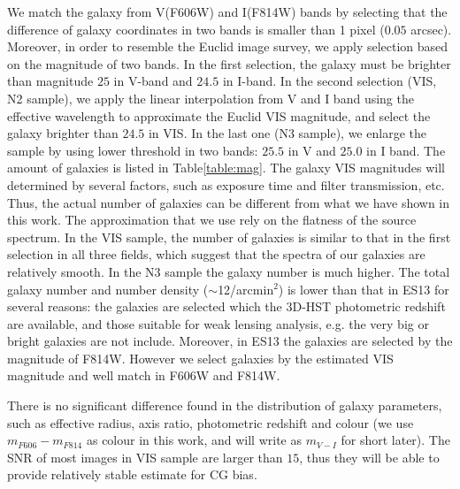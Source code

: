 \documentclass[useAMS,usenatbib]{mn2e}
\begin{document}
We match the galaxy from V(F606W) and I(F814W) bands by selecting that
the difference of galaxy coordinates in two bands is smaller than 1
pixel ($0.05$ arcsec). Moreover, in order to resemble the Euclid image
survey, we apply selection based on the magnitude of two bands. In the
first selection, the galaxy must be brighter than magnitude $25$ in
V-band and $24.5$ in I-band. In the second selection (VIS, N2 sample),
we apply the linear interpolation from V and I band using the
effective wavelength to approximate the Euclid VIS magnitude, and
select the galaxy brighter than $24.5$ in VIS. In the last one (N3
sample), we enlarge the sample by using lower threshold in two bands:
$25.5$ in V and $25.0$ in I band. The amount of galaxies is listed in
Table\ref{table:mag}.
%
The galaxy VIS magnitudes will determined by several factors, such as
exposure time and filter transmission, etc. Thus, the actual number of
galaxies can be different from what we have shown in this work. The
approximation that we use rely on the flatness of the source
spectrum. In the VIS sample, the number of galaxies is similar to that in
the first selection in all three fields, which suggest that the
spectra of our galaxies are relatively smooth. In the N3 sample the galaxy
number is much higher.
%
The total galaxy number and number density ($\sim$12/arcmin$^2$) is
lower than that in ES13 for several reasons: the galaxies are selected
which the 3D-HST photometric redshift are available, and those
suitable for weak lensing analysis, e.g. the very big or bright
galaxies are not include. Moreover, in ES13 the galaxies are selected
by the magnitude of F814W. However we select galaxies by the estimated
VIS magnitude and well match in F606W and F814W.

There is no significant difference found in the distribution of galaxy
parameters, such as effective radius, axis ratio, photometric redshift
and colour (we use $m_{F606}-m_{F814}$ as colour in this work, and
will write as $m_{V-I}$ for short later). The SNR of most images in VIS sample
are larger than $15$, thus they will be able to provide relatively
stable estimate for CG bias.
\end{document}
